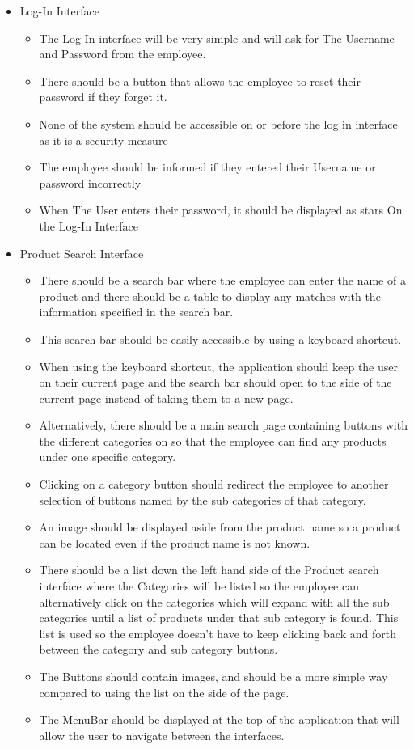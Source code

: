\begin{itemize}
	\item Log-In Interface
	\begin{itemize}
		\item The Log In interface will be very simple and will ask for The Username and Password from the employee.
		\item There should be a button that allows the employee to reset their password if they forget it.
		\item None of the system should be accessible on or before the log in interface as it is a security measure
		\item The employee should be informed if they entered their Username or password incorrectly
		\item When The User enters their password, it should be displayed as stars On the Log-In Interface
	\end{itemize}

	\item Product Search Interface
	\begin{itemize}
		\item There should be a search bar where the employee can enter the name of a product and there should be a table to display any matches with the information specified in the search bar.
		\item This search bar should be easily accessible by using a keyboard shortcut.
		\item When using the keyboard shortcut, the application should keep the user on their current page and the search bar should open to the side of the current page instead of taking them to a new page.
		\item Alternatively, there should be a main search page containing buttons with the different categories on so that the employee can find any products under one specific category.
		\item Clicking on a category button should redirect the employee to another selection of buttons named by the sub categories of that category.
		\item An image should be displayed aside from the product name so a product can be located even if the product name is not known.
		\item There should be a list down the left hand side of the Product search interface where the Categories will be listed so the employee can alternatively click on the categories which will expand with all the sub categories until a list of products under that sub category is found. This list is used so the employee doesn’t have to keep clicking back and forth between the category and sub category buttons.
		\item The Buttons should contain images, and should be a more simple way compared to using the list on the side of the page.
		\item The MenuBar should be displayed at the top of the application that will allow the user to navigate between the interfaces.
	\end{itemize}


\end{itemize}
